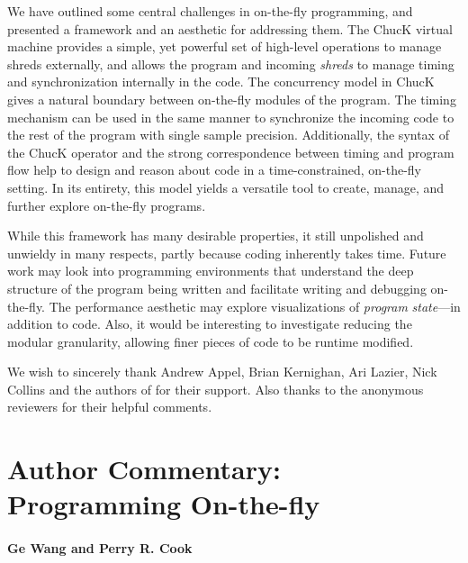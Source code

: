 We have outlined some central challenges in on-the-fly programming, and
presented a framework and an aesthetic for addressing them.  The ChucK virtual
machine provides a simple, yet powerful set of high-level operations to manage
shreds externally, and allows the program and incoming \textit{shreds} to manage
timing and synchronization internally in the code.  The concurrency model in
ChucK gives a natural boundary between on-the-fly modules of the program.  The
timing mechanism can be used in the same manner to synchronize the incoming code
to the rest of the program with single sample precision.  Additionally, the
syntax of the ChucK operator and the strong correspondence between timing and
program flow help to design and reason about code in a time-constrained,
on-the-fly setting.  In its entirety, this model yields a versatile tool to
create, manage, and further explore on-the-fly programs.

While this framework has many desirable properties, it still unpolished and
unwieldy in many respects, partly because coding inherently takes time.  Future
work may look into programming environments that understand the deep structure of
the program being written and facilitate writing and debugging on-the-fly.  The
performance aesthetic may explore visualizations of \textit{program}
\textit{state}---in addition to code.  Also, it would be interesting to
investigate reducing the modular granularity, allowing finer pieces of code to be
runtime modified.

\begin{acknowledgement}
We wish to sincerely thank Andrew Appel, Brian Kernighan, Ari Lazier, Nick
Collins and the authors of \cite{Collins:2003} for their support.  Also thanks to the anonymous
reviewers for their helpful comments.
\end{acknowledgement}


\section*{Author Commentary: Programming On-the-fly}

\paragraph{Ge Wang and Perry R. Cook}

